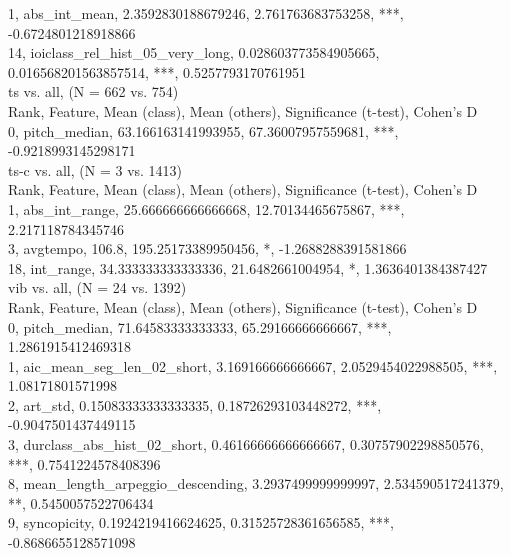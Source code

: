 1, abs_int_mean, 2.3592830188679246, 2.761763683753258, ***, -0.6724801218918866\\
14, ioiclass_rel_hist_05_very_long, 0.028603773584905665, 0.016568201563857514, ***, 0.5257793170761951\\
ts vs. all, (N = 662 vs. 754)\\
Rank, Feature, Mean (class), Mean (others), Significance (t-test), Cohen's D\\
0, pitch_median, 63.166163141993955, 67.36007957559681, ***, -0.9218993145298171\\
ts-c vs. all, (N = 3 vs. 1413)\\
Rank, Feature, Mean (class), Mean (others), Significance (t-test), Cohen's D\\
1, abs_int_range, 25.666666666666668, 12.70134465675867, ***, 2.217118784345746\\
3, avgtempo, 106.8, 195.25173389950456, *, -1.2688288391581866\\
18, int_range, 34.333333333333336, 21.6482661004954, *, 1.3636401384387427\\
vib vs. all, (N = 24 vs. 1392)\\
Rank, Feature, Mean (class), Mean (others), Significance (t-test), Cohen's D\\
0, pitch_median, 71.64583333333333, 65.29166666666667, ***, 1.2861915412469318\\
1, aic_mean_seg_len_02_short, 3.169166666666667, 2.0529454022988505, ***, 1.08171801571998\\
2, art_std, 0.15083333333333335, 0.18726293103448272, ***, -0.9047501437449115\\
3, durclass_abs_hist_02_short, 0.46166666666666667, 0.30757902298850576, ***, 0.7541224578408396\\
8, mean_length_arpeggio_descending, 3.2937499999999997, 2.534590517241379, **, 0.5450057522706434\\
9, syncopicity, 0.1924219416624625, 0.31525728361656585, ***, -0.8686655128571098\\
